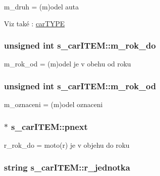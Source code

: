 m\-\_\-druh = (m)odel auta 

\begin{DoxySeeAlso}{\-Viz také}
\-: \hyperlink{io_8h_a3092c477112abb33d997526688293bed}{car\-T\-Y\-P\-E} 
\end{DoxySeeAlso}
\hypertarget{structs__carITEM_ad0b03b89f0df3e8b016c84cb8a8ae371}{
\subsubsection[{m\-\_\-rok\-\_\-do}]{\setlength{\rightskip}{0pt plus 5cm}unsigned int {\bf s\-\_\-car\-I\-T\-E\-M\-::m\-\_\-rok\-\_\-do}}}
\label{d7/da8/structs__carITEM_ad0b03b89f0df3e8b016c84cb8a8ae371}


m\-\_\-rok\-\_\-od = (m)odel je v obehu od roku 

\hypertarget{structs__carITEM_a577c657f610b4f7d778c0aa213ea08c9}{
\subsubsection[{m\-\_\-rok\-\_\-od}]{\setlength{\rightskip}{0pt plus 5cm}unsigned int {\bf s\-\_\-car\-I\-T\-E\-M\-::m\-\_\-rok\-\_\-od}}}
\label{d7/da8/structs__carITEM_a577c657f610b4f7d778c0aa213ea08c9}


m\-\_\-oznaceni = (m)odel oznaceni 

\hypertarget{structs__carITEM_a934faba6a15cd1f9836ad59caa0214a0}{
\subsubsection[{pnext}]{$\ast$ {\bf s\-\_\-car\-I\-T\-E\-M\-::pnext}}}
\label{d7/da8/structs__carITEM_a934faba6a15cd1f9836ad59caa0214a0}


r\-\_\-rok\-\_\-do = moto(r) je v objehu do roku 

\hypertarget{structs__carITEM_ab14179f26f8655f40d4e86950aadff7f}{
\subsubsection[{r\-\_\-jednotka}]{\setlength{\rightskip}{0pt plus 5cm}string {\bf s\-\_\-car\-I\-T\-E\-M\-::r\-\_\-jednotka}}}
\label{d7/da8/structs__carITEM_ab14179f26f8655f40d4e86950aadff7f}


